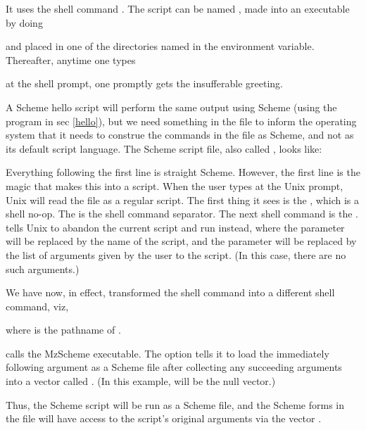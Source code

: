 
It uses the shell command .  The script can be
named , made into an executable by doing


\n and placed in one of
the directories named in the  environment
variable.  Thereafter, anytime one types


\n at the shell  prompt, one promptly gets the
insufferable greeting.

A Scheme hello script will perform the same output
using Scheme (using the program in sec \ref{hello}),
but we need something in the file to inform the
operating system that it needs to construe the commands
in the file as Scheme, and not as its default script
language.  The Scheme script file, also called
, looks like:


Everything following the first line is straight
Scheme.  However, the first line is the magic that
makes this into a script.  When the user types
 at the Unix prompt, Unix will read the file
as a regular script.  The first thing it sees is the
, which is a shell no-op.  The \p{;} is the shell
command separator.  The next shell command is the
.   tells Unix to abandon  the
current script and run  instead,
where the parameter  will be replaced by the name
of the script, and the parameter  will be
replaced by the list of arguments given by the user to
the script.  (In this case, there are no such
arguments.)

We have now, in effect, transformed the  shell
command into a different shell command, viz,


\n where  is the pathname of .

 calls the MzScheme executable.  The 
option tells it to load the immediately following
argument as a Scheme file after collecting any
succeeding arguments into a vector called .
(In this example,  will be the null vector.)

Thus, the Scheme script will be run as a Scheme file,
and the Scheme forms in the file will have access to
the script's original arguments via the vector
.

